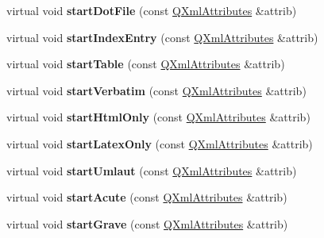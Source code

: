 \begin{DoxyCompactItemize}
virtual void {\bfseries start\+Dot\+File} (const \mbox{\hyperlink{class_q_xml_attributes}{Q\+Xml\+Attributes}} \&attrib)
\item 
\mbox{\label{class_paragraph_handler_a3abd7057608e28800ba398db752ae5a2}} 
virtual void {\bfseries start\+Index\+Entry} (const \mbox{\hyperlink{class_q_xml_attributes}{Q\+Xml\+Attributes}} \&attrib)
\item 
\mbox{\label{class_paragraph_handler_a6f17044f6b4dfd6fa49333a77294043c}} 
virtual void {\bfseries start\+Table} (const \mbox{\hyperlink{class_q_xml_attributes}{Q\+Xml\+Attributes}} \&attrib)
\item 
\mbox{\label{class_paragraph_handler_acbeb1e8ef8729b20a6c119bc38e607d6}} 
virtual void {\bfseries start\+Verbatim} (const \mbox{\hyperlink{class_q_xml_attributes}{Q\+Xml\+Attributes}} \&attrib)
\item 
\mbox{\label{class_paragraph_handler_adf0a616699f57d2eaae639846a54ea09}} 
virtual void {\bfseries start\+Html\+Only} (const \mbox{\hyperlink{class_q_xml_attributes}{Q\+Xml\+Attributes}} \&attrib)
\item 
\mbox{\label{class_paragraph_handler_a1e8de25137cb7f4cfbacc9b7136aca22}} 
virtual void {\bfseries start\+Latex\+Only} (const \mbox{\hyperlink{class_q_xml_attributes}{Q\+Xml\+Attributes}} \&attrib)
\item 
\mbox{\label{class_paragraph_handler_ae2cf63d369d9ed14ff5e020c4a553c89}} 
virtual void {\bfseries start\+Umlaut} (const \mbox{\hyperlink{class_q_xml_attributes}{Q\+Xml\+Attributes}} \&attrib)
\item 
\mbox{\label{class_paragraph_handler_aa8715e6f35fc96e59ebc619d346133cf}} 
virtual void {\bfseries start\+Acute} (const \mbox{\hyperlink{class_q_xml_attributes}{Q\+Xml\+Attributes}} \&attrib)
\item 
\mbox{\label{class_paragraph_handler_a3fc2750784c711133735026b2058c95c}} 
virtual void {\bfseries start\+Grave} (const \mbox{\hyperlink{class_q_xml_attributes}{Q\+Xml\+Attributes}} \&attrib)

\end{DoxyCompactItemize}
